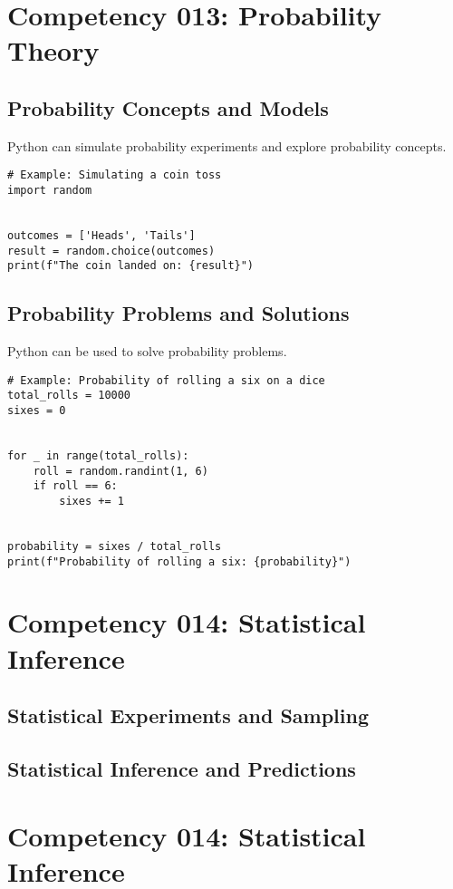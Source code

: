 \documentclass{book}
\begin{document}
\section{Competency 013: Probability Theory}
\subsection{Probability Concepts and Models}
Python can simulate probability experiments and explore probability concepts.


\begin{lstlisting}[style=pythonstyle]
# Example: Simulating a coin toss
import random


outcomes = ['Heads', 'Tails']
result = random.choice(outcomes)
print(f"The coin landed on: {result}")
\end{lstlisting}


\subsection{Probability Problems and Solutions}
Python can be used to solve probability problems.


\begin{lstlisting}[style=pythonstyle]
# Example: Probability of rolling a six on a dice
total_rolls = 10000
sixes = 0


for _ in range(total_rolls):
    roll = random.randint(1, 6)
    if roll == 6:
        sixes += 1


probability = sixes / total_rolls
print(f"Probability of rolling a six: {probability}")
\end{lstlisting}




\section{Competency 014: Statistical Inference}
\subsection{Statistical Experiments and Sampling}
\subsection{Statistical Inference and Predictions}


\section{Competency 014: Statistical Inference}
\end{document}
